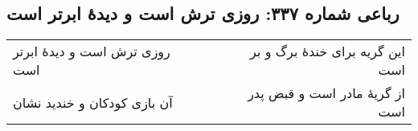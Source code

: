 \begin{center}
\section*{رباعی شماره ۳۳۷: روزی ترش است و دیدهٔ ابرتر است}
\label{sec:0337}
\begin{longtable}{l p{0.5cm} r}
روزی ترش است و دیدهٔ ابرتر است
&&
این گریه برای خندهٔ برگ و بر است
\\
آن بازی کودکان و خندید نشان
&&
از گریهٔ مادر است و قبض پدر است
\\
\end{longtable}
\end{center}
